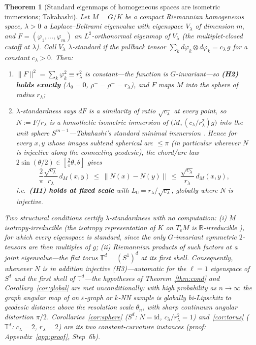 \documentclass[11pt]{article}
\newtheorem{theorem}{Theorem}
\theoremstyle{remark}
\begin{document}
\begin{theorem}[Standard eigenmaps of homogeneous spaces are isometric immersions; Takahashi]\label{thm:takahashi}
Let $M=G/K$ be a compact Riemannian homogeneous space, $\lambda>0$ a
Laplace--Beltrami eigenvalue with eigenspace $V_\lambda$ of dimension $m$, and
$F=(\varphi_1,\dots,\varphi_m)$ an $L^2$-orthonormal eigenmap of $V_\lambda$ (the
multiplet-closed cutoff at $\lambda$). Call $V_\lambda$ \emph{$\lambda$-standard}
if the pullback tensor $\sum_k d\varphi_k\otimes d\varphi_k=c_\lambda\,g$ for a
constant $c_\lambda>0$. Then:
\begin{enumerate}\itemsep2pt
\item[\textup{(a)}] $\lVert F\rVert^2=\sum_k\varphi_k^2\equiv r_\lambda^2$ is
constant---the function is $G$-invariant---so \textup{\textbf{(H2) holds exactly}}
($\Lambda_0=0$, $\rho^-=\rho^+=r_\lambda$), and $F$ maps $M$ into the sphere of
radius $r_\lambda$;
\item[\textup{(b)}] $\lambda$-standardness says $dF$ is a similarity of ratio
$\sqrt{c_\lambda}$ at every point, so $N:=F/r_\lambda$ is a homothetic isometric
immersion of $\big(M,(c_\lambda/r_\lambda^2)g\big)$ into the unit sphere
$S^{m-1}$---Takahashi's standard minimal immersion \cite{takahashi1966}. Hence for
every $x,y$ whose images subtend spherical arc $\le\pi$ (in particular wherever
$N$ is injective along the connecting geodesic), the chord/arc law
$2\sin(\theta/2)\in[\tfrac2\pi\theta,\theta]$ gives
\[
\frac2\pi\frac{\sqrt{c_\lambda}}{r_\lambda}\,d_M(x,y)\ \le\
\lVert N(x)-N(y)\rVert\ \le\ \frac{\sqrt{c_\lambda}}{r_\lambda}\,d_M(x,y),
\]
i.e.\ \textup{\textbf{(H1) holds at fixed scale}} with $L_0=r_\lambda/\sqrt{c_\lambda}$,
globally where $N$ is injective.
\end{enumerate}
Two structural conditions certify $\lambda$-standardness with no computation:
\textup{(i)} $M$ \emph{isotropy-irreducible} (the isotropy representation of $K$
on $T_oM$ is $\mathbb R$-irreducible \cite{wolf1968}), for which \emph{every}
eigenspace is standard, since the only $G$-invariant symmetric $2$-tensors are
then multiples of $g$; \textup{(ii)} Riemannian products of such factors at a
joint eigenvalue---the flat torus $\mathbb T^d=(S^1)^d$ at its first shell.
Consequently, whenever $N$ is in addition injective \textup{(H3)}---automatic for
the $\ell{=}1$ eigenspace of $S^d$ and the first shell of $\mathbb T^d$---the
hypotheses of Theorem~\ref{thm:cond} and Corollary~\ref{cor:global} are met
\emph{unconditionally}: with high probability as $n\to\infty$ the graph angular
map of an $\varepsilon$-graph or $k$-NN sample is globally bi-Lipschitz to
geodesic distance above the resolution scale $\theta_n$, with sharp continuum
angular distortion $\pi/2$. Corollaries~\ref{cor:sphere} ($S^d$: $N=\mathrm{id}$,
$c_\lambda/r_\lambda^2=1$) and~\ref{cor:torus} ($\mathbb T^d$: $c_\lambda=2$,
$r_\lambda=2$) are its two constant-curvature instances (proof:
Appendix~\ref{app:proof}, Step~6b).
\end{theorem}
\end{document}
